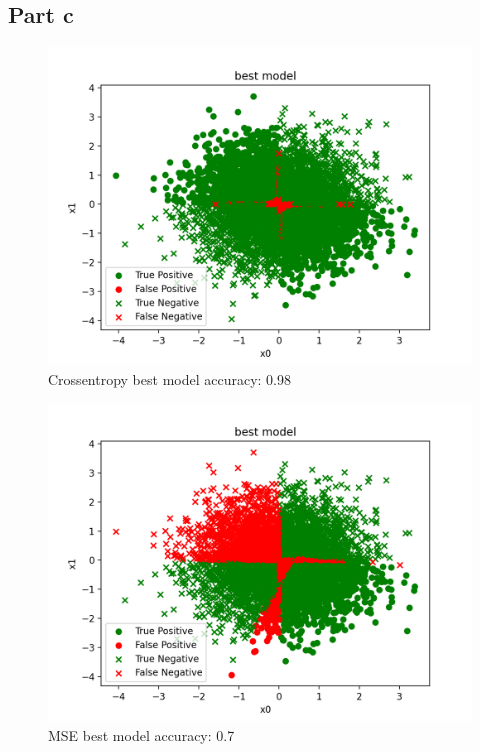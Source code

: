 \newpage
\subsection*{Part c}
\begin{figure}[!htbp]
    \centering\includegraphics[width=0.8\linewidth]{crossentropy_best_model.png}
    \caption[short]{Crossentropy best model accuracy: 0.98}
\end{figure}

\begin{figure}[!h]
    \centering\includegraphics[width=0.8\linewidth]{mse_best_model.png}
    \caption[short]{MSE best model accuracy: 0.7}
\end{figure}